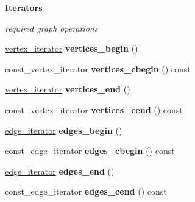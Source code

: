 \begin{Indent}{\bf Iterators}\par
{\em required graph operations }\begin{DoxyCompactItemize}
\item 
\hypertarget{classmystl_1_1graph_af345ac781b3c5f8c5507b26750e80db5}{\hyperlink{classmystl_1_1graph_a173b6e21e17fd9bafdd7594b2ba3ef0a}{vertex\+\_\+iterator} {\bfseries vertices\+\_\+begin} ()}\label{classmystl_1_1graph_af345ac781b3c5f8c5507b26750e80db5}

\item 
\hypertarget{classmystl_1_1graph_a7132eb9c3130efa49e521ff5d64de659}{const\+\_\+vertex\+\_\+iterator {\bfseries vertices\+\_\+cbegin} () const }\label{classmystl_1_1graph_a7132eb9c3130efa49e521ff5d64de659}

\item 
\hypertarget{classmystl_1_1graph_ae03d839b0bc65ae3337519aa791ac485}{\hyperlink{classmystl_1_1graph_a173b6e21e17fd9bafdd7594b2ba3ef0a}{vertex\+\_\+iterator} {\bfseries vertices\+\_\+end} ()}\label{classmystl_1_1graph_ae03d839b0bc65ae3337519aa791ac485}

\item 
\hypertarget{classmystl_1_1graph_ae6dc5a4a8da0990502bfcd146854a305}{const\+\_\+vertex\+\_\+iterator {\bfseries vertices\+\_\+cend} () const }\label{classmystl_1_1graph_ae6dc5a4a8da0990502bfcd146854a305}

\item 
\hypertarget{classmystl_1_1graph_af61b17c57aeb83bf8c66979276ad7941}{\hyperlink{classmystl_1_1graph_aca4e86526b9606bc4a568b0c4e127b3f}{edge\+\_\+iterator} {\bfseries edges\+\_\+begin} ()}\label{classmystl_1_1graph_af61b17c57aeb83bf8c66979276ad7941}

\item 
\hypertarget{classmystl_1_1graph_ace540bc4fda9c0a5a6701c252af21a1a}{const\+\_\+edge\+\_\+iterator {\bfseries edges\+\_\+cbegin} () const }\label{classmystl_1_1graph_ace540bc4fda9c0a5a6701c252af21a1a}

\item 
\hypertarget{classmystl_1_1graph_aecd73d2b1bebbe9ea30f813709db1006}{\hyperlink{classmystl_1_1graph_aca4e86526b9606bc4a568b0c4e127b3f}{edge\+\_\+iterator} {\bfseries edges\+\_\+end} ()}\label{classmystl_1_1graph_aecd73d2b1bebbe9ea30f813709db1006}

\item 
\hypertarget{classmystl_1_1graph_adfecdeafcf7092e0f715ebd9c221c1bd}{const\+\_\+edge\+\_\+iterator {\bfseries edges\+\_\+cend} () const }\label{classmystl_1_1graph_adfecdeafcf7092e0f715ebd9c221c1bd}

\end{DoxyCompactItemize}
\end{Indent}
